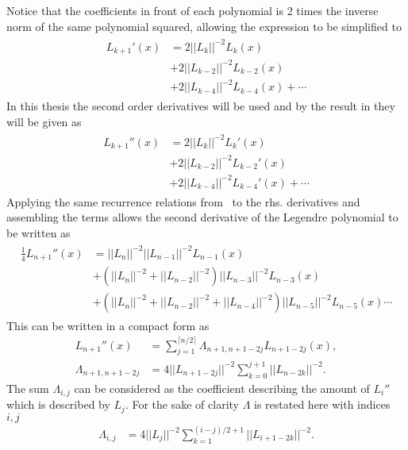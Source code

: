 Notice that the coefficients in front of each polynomial is 2 times the inverse norm of the same polynomial squared, allowing the expression 
to be simplified to 
\begin{align}
    \begin{split}
    L_{k+1}'(x) &= 2||L_k||^{-2}L_k(x)\\
    &+2||L_{k-2}||^{-2}L_{k-2}(x)\\
    &+2||L_{k-4}||^{-2}L_{k-4}(x)+\cdots 
    \end{split}
    \label{eq:der-explicit}
\end{align}
In this thesis the second order derivatives will be used and by the result in  they will be given as 
\begin{align}
    \begin{split}
    L_{k+1}''(x) &= 2||L_k||^{-2}L_k'(x)\\
    &+2||L_{k-2}||^{-2}L_{k-2}'(x)\\
    &+2||L_{k-4}||^{-2}L_{k-4}'(x)+\cdots 
    \end{split}
    \label{eq:der-explicit}
\end{align}
Applying the same recurrence relations from~ to the rhs. derivatives and assembling the terms allows the 
second derivative of the Legendre polynomial to be written as 
\begin{align}
    \begin{split}
        \frac{1}{4}L_{n+1}''(x) &= ||L_n||^{-2}||L_{n-1}||^{-2}L_{n-1}(x)\\
        &+\left( ||L_n||^{-2}+||L_{n-2}||^{-2} \right)||L_{n-3}||^{-2}L_{n-3}(x)\\
        &+\left( ||L_n||^{-2}+||L_{n-2}||^{-2}+||L_{n-4}||^{-2} \right)||L_{n-5}||^{-2}L_{n-5}(x) \cdots
    \end{split}
    \label{eq:laplacian-explicit}
\end{align}
This can be written in a compact form as
\begin{align}
    L_{n+1}''(x) &= \sum_{j=1}^{\lceil n/2 \rceil}\Lambda_{n+1,n+1-2j}L_{n+1-2j}(x),\\
    \Lambda_{n+1,n+1-2j} &= 4||L_{n+1-2j}||^{-2}\sum_{k=0}^{j+1}||L_{n-2k}||^{-2}.
    \label{eq:legendresummation}
\end{align}
The sum $\Lambda_{i,j}$ can be considered as the coefficient describing the amount of $L_i''$ 
which is described by $L_j$. For the sake of clarity $\Lambda$ is restated here with indices $i,j$
\begin{align}
    \Lambda_{i,j} &= 4||L_{j}||^{-2}\sum_{k=1}^{(i-j)/2+1}||L_{i+1-2k}||^{-2}.
    \label{eq:legendresummation}
\end{align}
